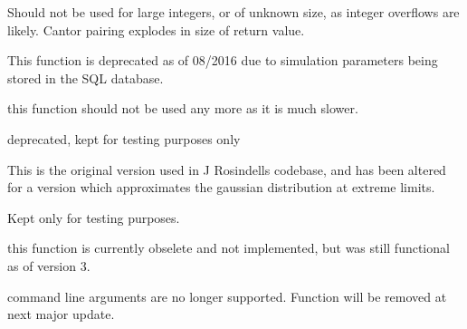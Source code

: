 
\begin{DoxyRefList}
\item[\label{deprecated__deprecated000002}%
\hypertarget{deprecated__deprecated000002}{}%
Member \hyperlink{_filesystem_8h_a494775fbade46418f7584db133d85762}{cantor\+Pairing} (unsigned long x1, unsigned long x2)]Should not be used for large integers, or of unknown size, as integer overflows are likely. Cantor pairing explodes in size of return value. 
\item[\label{deprecated__deprecated000001}%
\hypertarget{deprecated__deprecated000001}{}%
Member \hyperlink{class_community_a579c5f423fc2461838a80baf6b396310}{Community\+:\+:detect\+Dimensions} (string db)]This function is deprecated as of 08/2016 due to simulation parameters being stored in the S\+QL database.  
\item[\label{deprecated__deprecated000003}%
\hypertarget{deprecated__deprecated000003}{}%
Member \hyperlink{class_matrix_aab2f77cfbdbeffcfe67d63d876581b2e}{Matrix$<$ T $>$\+:\+:import\+Csv} (const string \&filename)]this function should not be used any more as it is much slower.  
\item[\label{deprecated__deprecated000005}%
\hypertarget{deprecated__deprecated000005}{}%
Member \hyperlink{class_n_rrand_a3ec8aae87ae486ddfb5ad481a7972c27}{N\+Rrand\+:\+:fattail} ()]deprecated, kept for testing purposes only  
\item[\label{deprecated__deprecated000004}%
\hypertarget{deprecated__deprecated000004}{}%
Member \hyperlink{class_n_rrand_a464101f3def678477f9156d0bd1aab54}{N\+Rrand\+:\+:fattail} (double z)]This is the original version used in J Rosindell\textquotesingle{}s codebase, and has been altered for a version which approximates the gaussian distribution at extreme limits.  
\item[\label{deprecated__deprecated000006}%
\hypertarget{deprecated__deprecated000006}{}%
Member \hyperlink{class_n_rrand_aab0ec97e2c0f74cf38cc7047356cae5c}{N\+Rrand\+:\+:fattail\+\_\+old} ()]Kept only for testing purposes.  
\item[\label{deprecated__deprecated000008}%
\hypertarget{deprecated__deprecated000008}{}%
Member \hyperlink{class_spatial_tree_a96919ff86b2a4d1de5ba14c2598a9346}{Spatial\+Tree\+:\+:est\+Specnum} ()]this function is currently obselete and not implemented, but was still functional as of version 3. 
\item[\label{deprecated__deprecated000007}%
\hypertarget{deprecated__deprecated000007}{}%
Member \hyperlink{class_spatial_tree_ad6a5412bccbccc92a302b2fb05bbced2}{Spatial\+Tree\+:\+:parse\+Args} (vector$<$ string $>$ \&comargs)]command line arguments are no longer supported. Function will be removed at next major update. 
\end{DoxyRefList}